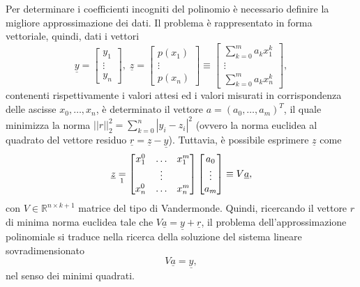 Per determinare i coefficienti incogniti del polinomio è necessario definire la migliore approssimazione dei dati. Il problema è rappresentato in forma vettoriale, quindi, dati i vettori
\begin{equation}
    \underline{y}=
    \begin{bmatrix}
        y_1\\
        \vdots\\
        y_n
    \end{bmatrix},\;
    \underline{z}=
    \begin{bmatrix}
        p(x_1)\\
        \vdots\\
        p(x_n)
    \end{bmatrix}
    \equiv
    \begin{bmatrix}
        \sum_{k=0}^m a_kx_1^k\\
        \vdots\\
        \sum_{k=0}^m a_kx_n^k
    \end{bmatrix},
\end{equation}
contenenti rispettivamente i valori attesi ed i valori misurati in corrispondenza delle ascisse $x_0,\hdots,x_n$, è determinato il vettore $a=(a_0,\hdots,a_m)^T$, il quale minimizza la norma $||r||_2^2=\sum_{k=0}^n|y_i-z_i|^2$ (ovvero la norma euclidea al quadrato del vettore residuo $\underline{r}=\underline{z}-\underline{y}$). Tuttavia, è possibile esprimere $\underline{z}$ come
\begin{equation*}
    \underline{z}\underset{\footnotemark}{=}
    \begin{bmatrix}
        x_1^0&\hdots &x_1^m\\
        &\vdots&\\
        x_n^0& \hdots &x_n^m
    \end{bmatrix}
    \begin{bmatrix}
        a_0\\
        \vdots\\
        a_m
    \end{bmatrix}
    \equiv V\underline{a},
\end{equation*}con $V\in \mathbb R^{n\times k+1}$ matrice del tipo di Vandermonde. Quindi, ricercando il vettore $r$ di minima norma euclidea tale che $V\underline{a}=\underline{y}+\underline{r}$, il problema dell'approssimazione polinomiale si traduce nella ricerca della soluzione del sistema lineare sovradimensionato
\begin{equation}\label{eq:Va=y}
    V\underline{a}=\underline{y},
\end{equation}
nel senso dei minimi quadrati.

